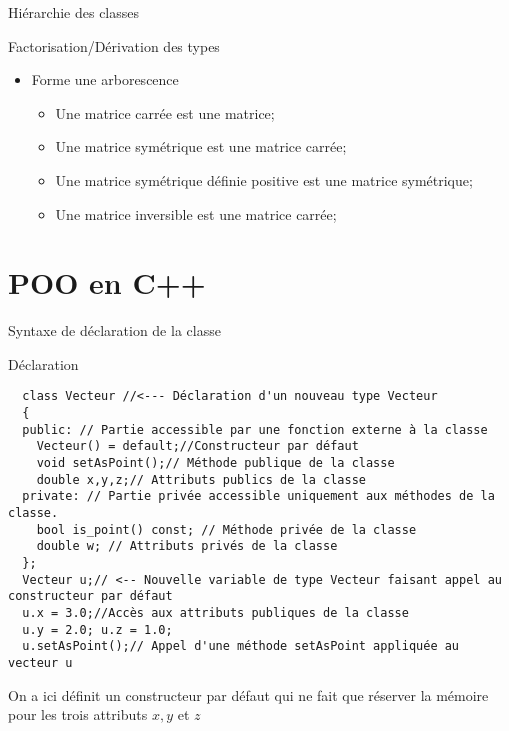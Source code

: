 \documentclass[compress,10pt,aspectratio=169]{beamer}
\begin{document}
\begin{frame}[fragile]{Hiérarchie des classes}
  \scriptsize
  \begin{block}{\small Factorisation/Dérivation des types}
  \begin{itemize}
  \item Forme une arborescence 
  \begin{itemize}
  \scriptsize
  \item Une matrice carrée est une matrice;
  \item Une matrice symétrique est une matrice carrée;
  \item Une matrice symétrique définie positive est une matrice symétrique;
  \item Une matrice inversible est une matrice carrée; 
  \end{itemize}
  \end{itemize}
  \end{block}
  \end{frame}

\section{POO en C++}

\begin{frame}[fragile]{Syntaxe de déclaration de la classe}
    \scriptsize
    \begin{block}{\small Déclaration}
  \begin{verbatim}
  class Vecteur //<--- Déclaration d'un nouveau type Vecteur
  {
  public: // Partie accessible par une fonction externe à la classe
    Vecteur() = default;//Constructeur par défaut
    void setAsPoint();// Méthode publique de la classe
    double x,y,z;// Attributs publics de la classe
  private: // Partie privée accessible uniquement aux méthodes de la classe.
    bool is_point() const; // Méthode privée de la classe
    double w; // Attributs privés de la classe
  };
  Vecteur u;// <-- Nouvelle variable de type Vecteur faisant appel au constructeur par défaut
  u.x = 3.0;//Accès aux attributs publiques de la classe
  u.y = 2.0; u.z = 1.0;
  u.setAsPoint();// Appel d'une méthode setAsPoint appliquée au vecteur u
  \end{verbatim}
  \end{block}
  \vspace*{-2mm}
  On a ici définit un constructeur par défaut qui ne fait que réserver la mémoire pour les trois attributs $x,y$ et $z$
  \end{frame}
\end{document}
